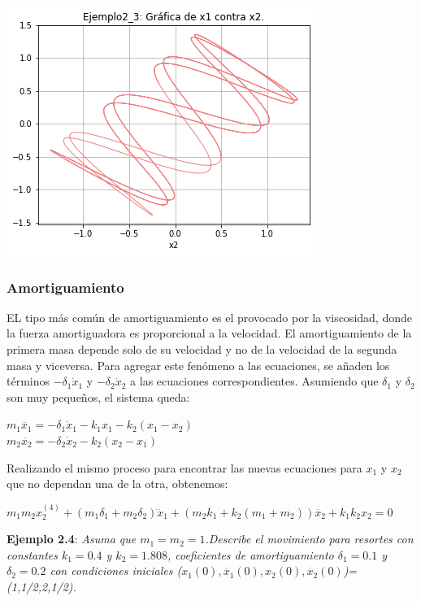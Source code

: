 \documentclass{article}
\begin{document}
\begin{center}
    \includegraphics[width=.45\textwidth]{Ejemplo2_3Posiciones.png}
\end{center}
\subsubsection{Amortiguamiento}
EL tipo más común de amortiguamiento es el provocado por la viscosidad, donde la fuerza amortiguadora es proporcional a la velocidad. El amortiguamiento de la primera masa depende solo de su velocidad y no de la velocidad de la segunda masa y viceversa. Para agregar este fenómeno a las ecuaciones, se añaden los términos $-\delta_{1} \dot{x}_{1}$ y $-\delta_{2} \dot{x}_{2}$ a las ecuaciones correspondientes. Asumiendo que $\delta_{1}$ y $\delta_{2}$ son muy pequeños, el sistema queda:
\begin{center}
$m_{1}\ddot{x_{1}}=-\delta_{1} \dot{x}_{1}-k_{1}x_{1}-k_{2}(x_{1}-x_{2})$ \\
$m_{2}\ddot{x_{2}}=-\delta_{2} \dot{x}_{2}-k_{2}(x_{2}-x_{1})$
\end{center}
Realizando el mismo proceso para encontrar las nuevas ecuaciones para $x_{1}$ y $x_{2}$ que no dependan una de la otra, obtenemos:
\begin{center}
$m_{1}m_{2}x_{2}^{(4)}+(m_{1}\delta_{1}+m_{2}\delta_{2})\dddot{x}_{1}+(m_{2}k_{1}+k_{2}(m_{1}+m_{2}))\ddot{x_{2}}+k_{1}k_{2}x_{2}=0$
\end{center}

\textbf{Ejemplo 2.4}:\textsl{ Asuma que $m_{1}=m_{2}=1$.Describe el movimiento para resortes con constantes $k_{1}=0.4$ y $k_{2}=1.808$, coeficientes de amortiguamiento $\delta_{1}=0.1$ y $\delta_{2}=0.2$ con condiciones iniciales ($x_{1}(0),\dot{x_{1}}(0), x_{2}(0),\dot{x_{2}}(0)$)=(1,1/2,2,1/2).}
\end{document}
